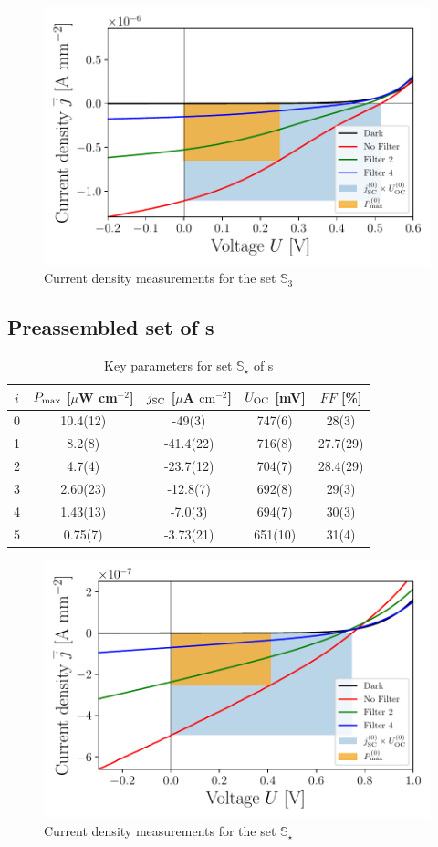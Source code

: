 \begin{figure}[h]\centering
\includegraphics[width=\columnwidth]{../../../IV-Curve-Analysis/OSC2Graph.pdf}
\caption{Current density measurements for the set $\mathbb{S}_3$}
\label{fig:OSC3Graph}
\end{figure}

\subsection{Preassembled set of \BHSC s}

\begin{table}[h]\centering
\caption{Key parameters for set $\mathbb{S}_\star$ of \BHSC s}
\label{tab:keyparamsstar}
\begin{tabular}{@{}ccccc@{}}\toprule
$i$ & $P_{\text{max}}$ [$\mu$W cm$^{-2}$] & $j_{\text{SC}}$ [$\mu$A $\mathrm{cm}^{-2}$] & $U_{\text{OC}}$ [mV] & $FF$ [\%]\\\midrule
0 &   10.4(12)  &  -49(3)  & 747(6) & 28(3) \\
1 &   8.2(8)  &  -41.4(22)  & 716(8) & 27.7(29) \\
2 &   4.7(4)  &  -23.7(12)  & 704(7) & 28.4(29) \\
3 &   2.60(23)  &  -12.8(7)  & 692(8) & 29(3) \\
4 &   1.43(13)  &  -7.0(3)  & 694(7) & 30(3)\\
5 &  0.75(7)  &  -3.73(21)  & 651(10) & 31(4) \\\bottomrule
\end{tabular}
\end{table}

\begin{figure}[h]\centering
\includegraphics[width=\columnwidth]{../../../IV-Curve-Analysis/OSCPGraph.pdf}
\caption{Current density measurements for the set $\mathbb{S}_\star$}
\label{fig:OSCstarGraph}
\end{figure}

